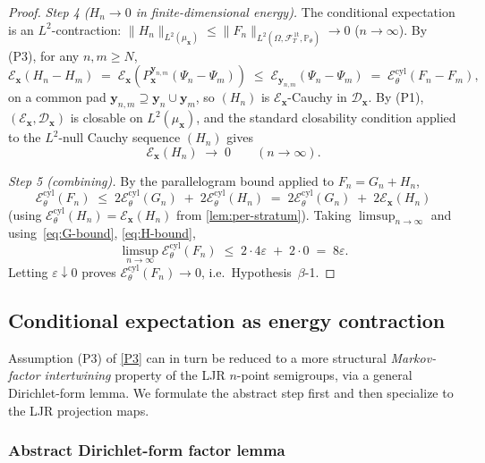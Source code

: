 \documentclass[11pt,reqno]{amsart}
\theoremstyle{plain}
\theoremstyle{definition}
\theoremstyle{remark}
\newcommand{\Prob}{\mathbb P}
\newcommand{\cE}{\mathcal E}
\newcommand{\cF}{\mathcal F}
\newcommand{\FT}{\cF_{T}^{\,\mathrm{1t}}}
\newcommand{\Hone}{L^{2}(\Omega,\FT,\Pth)}
\newcommand{\Ecyl}{\cE_{\theta}^{\mathrm{cyl}}}
\newcommand{\Pth}{\Prob_{\theta}}
\begin{document}
\begin{proof}
\emph{Step 4 ($H_{n}\to 0$ in finite-dimensional energy).} The
conditional expectation is an $L^{2}$-contraction:
$\|H_{n}\|_{L^{2}(\mu_{\mathbf x})}\le\|F_{n}\|_{\Hone}\to 0$
($n\to\infty$). By (P3), for any $n,m\ge N$,
\[
  \cE_{\mathbf x}(H_{n}-H_{m})
  \;=\;\cE_{\mathbf x}(P_{\mathbf x}^{\mathbf y_{n,m}}(\Psi_{n}-\Psi_{m}))
  \;\le\;\cE_{\mathbf y_{n,m}}(\Psi_{n}-\Psi_{m})
  \;=\;\Ecyl(F_{n}-F_{m}),
\]
on a common pad $\mathbf y_{n,m}\supseteq\mathbf y_{n}\cup\mathbf y_{m}$,
so $(H_{n})$ is $\cE_{\mathbf x}$-Cauchy in $\mathcal D_{\mathbf x}$.
By (P1), $(\cE_{\mathbf x},\mathcal D_{\mathbf x})$ is closable
on $L^{2}(\mu_{\mathbf x})$, and the standard closability condition
applied to the $L^{2}$-null Cauchy sequence $(H_{n})$ gives
\begin{equation}\label{eq:H-bound}
  \cE_{\mathbf x}(H_{n})\;\longrightarrow\;0\qquad(n\to\infty).
\end{equation}

\emph{Step 5 (combining).} By the parallelogram bound applied to
$F_{n}=G_{n}+H_{n}$,
\[
  \Ecyl(F_{n})\;\le\;2\Ecyl(G_{n})\;+\;2\Ecyl(H_{n})
  \;=\;2\Ecyl(G_{n})\;+\;2\cE_{\mathbf x}(H_{n})
\]
(using $\Ecyl(H_{n})=\cE_{\mathbf x}(H_{n})$ from
\cref{lem:per-stratum}). Taking $\limsup_{n\to\infty}$ and
using~\eqref{eq:G-bound}, \eqref{eq:H-bound},
\[
  \limsup_{n\to\infty}\Ecyl(F_{n})\;\le\;2\cdot 4\varepsilon\;+\;2\cdot 0
  \;=\;8\varepsilon.
\]
Letting $\varepsilon\downarrow 0$ proves $\Ecyl(F_{n})\to 0$, i.e.\
Hypothesis~$\beta$-1.
\end{proof}

\subsection{Conditional expectation as energy contraction}\label{sec:formclos-CE-contraction}

Assumption (P3) of \cref{P3} can in turn be reduced to a more
structural \emph{Markov-factor intertwining} property of the LJR
$n$-point semigroups, via a general Dirichlet-form lemma. We
formulate the abstract step first and then specialize to the LJR
projection maps.

\subsubsection*{Abstract Dirichlet-form factor lemma}
\end{document}
